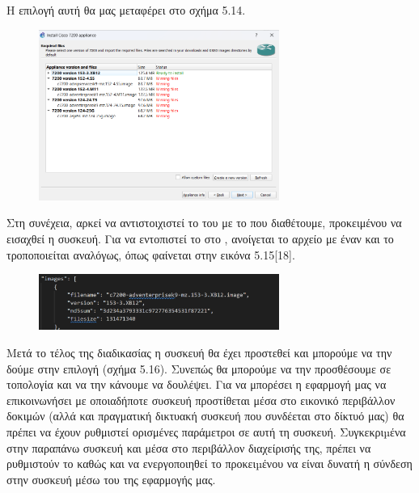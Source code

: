 \FloatBarrier

\noindent Η επιλογή αυτή θα μας μεταφέρει στο σχήμα 5.14.

\begin{figure}[htb]
	\centering
	\includegraphics[width=0.7\textwidth]{graphics/appliances.png}
	\caption{ }
\end{figure}

\FloatBarrier

\noindent Στη συνέχεια, αρκεί να αντιστοιχιστεί το  του  με το  που διαθέτουμε, προκειμένου να εισαχθεί η συσκευή. Για να εντοπιστεί το  στο , ανοίγεται το αρχείο με έναν  και το  τροποποιείται αναλόγως, όπως φαίνεται στην εικόνα 5.15[18].

\FloatBarrier

\begin{figure}[htb]
	\centering
	\includegraphics[width=0.7\textwidth]{graphics/appliance_filename.png}
	\caption{ }
\end{figure}

\FloatBarrier

Μετά το τέλος της διαδικασίας η συσκευή θα έχει προστεθεί και μπορούμε να την δούμε στην επιλογή (σχήμα 5.16).
Συνεπώς θα μπορούμε να την προσθέσουμε σε τοπολογία και να την κάνουμε να δουλέψει. Για να μπορέσει η εφαρμογή μας να επικοινωνήσει με οποιαδήποτε συσκευή προστίθεται μέσα στο εικονικό περιβάλλον δοκιμών (αλλά και πραγματική δικτυακή συσκευή που συνδέεται στο δίκτυό μας) θα πρέπει να έχουν ρυθμιστεί ορισμένες παράμετροι σε αυτή τη συσκευή. Συγκεκριµένα στην παραπάνω συσκευή  και μέσα στο περιβάλλον διαχείρισής της, πρέπει να ρυθμιστούν το  καθώς και να ενεργοποιηθεί το  προκειµένου να είναι δυνατή η σύνδεση στην συσκευή μέσω του  της εφαρμογής μας.


